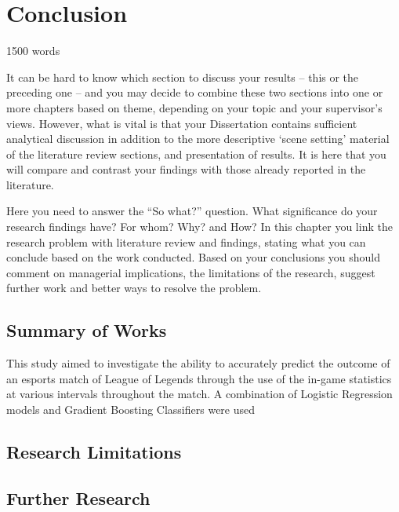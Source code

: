 \chapter{Conclusion}\label{ch:conclusion}

1500 words

It can be hard to know which section to discuss your results – this or the preceding one – and you may decide to combine
these two sections into one or more chapters based on theme, depending on your topic and your supervisor’s views.
However, what is vital is that your Dissertation contains sufficient analytical discussion in addition to the more descriptive ‘scene setting’
material of the literature review sections, and presentation of results.
It is here that you will compare and contrast your findings with those already reported in the literature.

Here you need to answer the “So what?” question.
What significance do your research findings have?
For whom?
Why?
and How?
In this chapter you link the research problem with literature review and findings, stating what you can conclude based on the work conducted.
Based on your conclusions you should comment on managerial implications, the limitations of the research, suggest further work and better ways to resolve the problem.

\section{Summary of Works}\label{sec:Summary of Works}

This study aimed to investigate the ability to accurately predict the outcome of an esports match of League of Legends through the use of the in-game statistics at various intervals throughout the match.
A combination of Logistic Regression models and Gradient Boosting Classifiers were used

\section{Research Limitations}\label{sec:Research Limitations}


\section{Further Research}\label{sec:Further Research}
